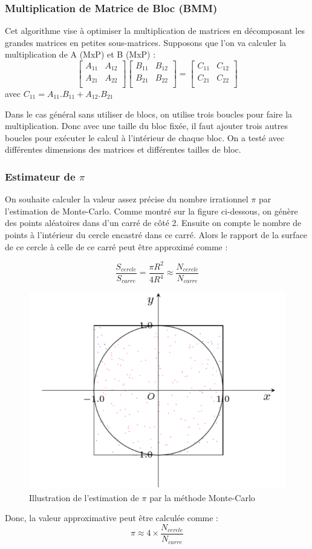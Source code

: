 \documentclass[12pt,a4paper]{ieee}
\begin{document}
\subsubsection{Multiplication de Matrice de Bloc (BMM)}
Cet algorithme vise à optimiser la multiplication de matrices en décomposant les grandes matrices en petites sous-matrices. Supposons que l’on va calculer la multiplication de A (MxP) et B (MxP) :
$$
\begin{bmatrix}
A_{11} & A_{12}\\
A_{21} & A_{22}\\
\end{bmatrix}
\begin{bmatrix}
B_{11} & B_{12}\\
B_{21} & B_{22}\\
\end{bmatrix}
=
\begin{bmatrix}
C_{11} & C_{12}\\
C_{21} & C_{22}\\
\end{bmatrix}
$$
avec $ C_{11} = A_{11}.B_{11} + A_{12}.B_{21}$

Dans le cas général sans utiliser de blocs, on utilise trois boucles pour faire la multiplication. Donc avec une taille du bloc fixée, il faut ajouter trois autres boucles pour exécuter le calcul à l’intérieur de chaque bloc. On a testé avec différentes dimensions des matrices et différentes tailles de bloc. 

\subsubsection{Estimateur de $\pi$}
On souhaite calculer la valeur assez précise du nombre irrationnel $\pi$ par l'estimation de Monte-Carlo. Comme montré sur la figure ci-dessous, on génère des points aléatoires dans d’un carré de côté 2. Ensuite on compte le nombre de points à l’intérieur du cercle encastré dans ce carré. Alors le rapport de la surface de ce cercle à celle de ce carré peut être approximé comme :

$$ \dfrac{S_{cercle}}{S_{carre}} = \dfrac{\pi R^2}{4R^4} \approx \dfrac{N_{cercle}}{N_{carre}}$$
\begin{figure}[H]
	\centering
	\includegraphics[width=0.5\linewidth]{soft/screenshot002}
	\caption{Illustration de l'estimation de $\pi$ par la méthode Monte-Carlo}
	\label{fig:screenshot002}
\end{figure}
Donc, la valeur approximative peut être calculée comme :
$$ \pi \approx 4 \times \dfrac{N_{cercle}}{N_{carre}}$$
\end{document}
